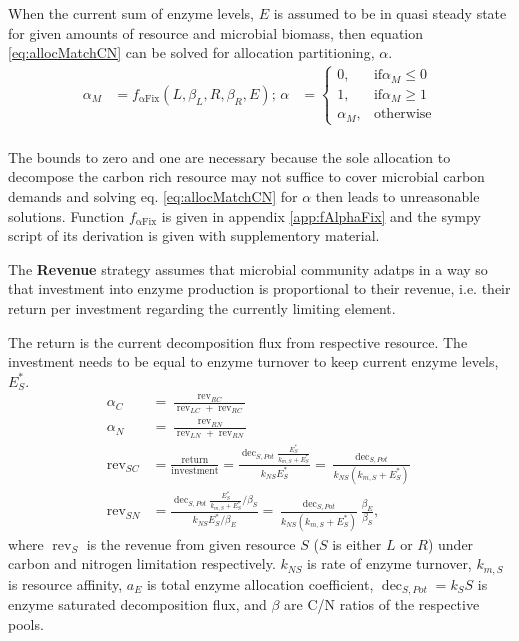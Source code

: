  When the current sum of enzyme levels, $E$ is assumed to be in quasi
steady state for given amounts of resource and microbial biomass, then equation
\ref{eq:allocMatchCN} can be solved for allocation partitioning, $\alpha$.
\begin{subequations}
\label{eq:allocMatch} 
\begin{align}
\alpha_M &= f_{\operatorname{{\alpha}Fix}}(L,\beta_L,R,\beta_R, E); \,
\alpha &= \begin{cases}
  0,  & \text{if} \alpha_M \le 0 \\
  1,  & \text{if} \alpha_M \ge 1 \\
  \alpha_M, & \text{otherwise}
\end{cases} \\  
\end{align}
\end{subequations}

The bounds to zero and one are necessary because the sole
allocation to decompose the carbon rich resource may not suffice to
cover microbial carbon demands and solving eq. \ref{eq:allocMatchCN} for
$\alpha$ then leads to unreasonable solutions.
Function $f_{\operatorname{{\alpha}Fix}}$ is given in appendix
\ref{app:fAlphaFix} and the sympy script of its 
derivation is given with supplementory material. 

The \textbf{Revenue} strategy assumes that microbial community adatps in a way
so that investment into enzyme production is proportional to their revenue, i.e.
their return per investment regarding the currently limiting element.

The return is the current decomposition flux from respective resource. The
investment needs to be equal to enzyme turnover to keep current enzyme levels,
$E_S^*$.
% 
\begin{subequations}
\label{eq:allocRev}
\begin{align}
\alpha_C &= \frac{\operatorname{rev}_{RC}}{\operatorname{rev}_{LC} + \operatorname{rev}_{RC}} \\
\alpha_N &= \frac{\operatorname{rev}_{RN}}{\operatorname{rev}_{LN} + \operatorname{rev}_{RN}} \\
\operatorname{rev}_{SC} &= \frac{\text{return}}{\text{investment}} 
= \frac{\operatorname{dec}_{S,Pot} \frac{E_S^*}{k_{m,S} + E_S^*}} {k_{NS}E_S^*} 
= \frac{\operatorname{dec}_{S,Pot}} {k_{NS}(k_{m,S} + E_S^*)} \\ 
\operatorname{rev}_{SN} &= \frac{\operatorname{dec}_{S,Pot}
\frac{E_S^*}{k_{m,S} + E_S^*} / \beta_S} {k_{NS} E_S^* / \beta_E} 
= \frac{\operatorname{dec}_{S,Pot}}{k_{NS} (k_{m,S} + E_S^*)}
\frac{\beta_E}{\beta_S}
\text{,} 
\end{align}
\end{subequations}
where $\operatorname{rev}_S$ is the revenue from given resource $S$ ($S$ is either $L$ or $R$)
under carbon and nitrogen limitation respectively.
$k_{NS}$ is rate of enzyme turnover, $k_{m,S}$ is resource affinity, $a_E$ is
total enzyme allocation coefficient, $\operatorname{dec}_{S,Pot} = k_S S$ is
enzyme saturated decomposition flux, and $\beta$ are C/N ratios of the
respective pools.

